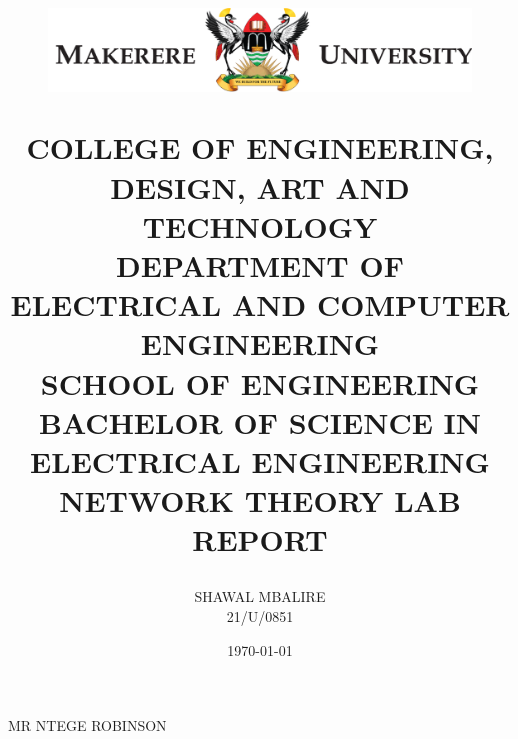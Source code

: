 \documentclass{article}
\title{
    \begin{figure}[H]
        \centering
        \includegraphics{../mak_logo.png}
    \end{figure}
    COLLEGE OF ENGINEERING, DESIGN, ART AND TECHNOLOGY\\
    DEPARTMENT OF ELECTRICAL AND COMPUTER ENGINEERING\\
    SCHOOL OF ENGINEERING\\
    BACHELOR OF SCIENCE IN ELECTRICAL ENGINEERING\\
    NETWORK THEORY LAB REPORT\\
}
\author{
    SHAWAL MBALIRE\\
    21/U/0851
}
\date{\today}
\begin{document}
\maketitle
\vfil
\begin{center}
    MR NTEGE ROBINSON
\end{center}



\end{document}
